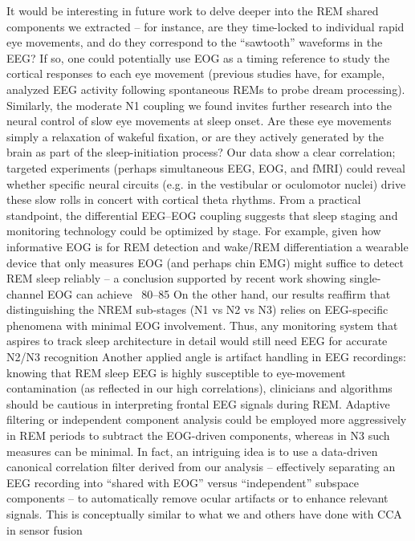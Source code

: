 It would be interesting in future work to delve deeper into the REM shared components we extracted – for instance, are they time-locked to individual rapid eye movements, and do they correspond to the “sawtooth” waveforms in the EEG? If so, one could potentially use EOG as a timing reference to study the cortical responses to each eye movement (previous studies have, for example, analyzed EEG activity following spontaneous REMs to probe dream processing). Similarly, the moderate N1 coupling we found invites further research into the neural control of slow eye movements at sleep onset. Are these eye movements simply a relaxation of wakeful fixation, or are they actively generated by the brain as part of the sleep-initiation process? Our data show a clear correlation; targeted experiments (perhaps simultaneous EEG, EOG, and fMRI) could reveal whether specific neural circuits (e.g. in the vestibular or oculomotor nuclei) drive these slow rolls in concert with cortical theta rhythms. From a practical standpoint, the differential EEG–EOG coupling suggests that sleep staging and monitoring technology could be optimized by stage. For example, given how informative EOG is for REM detection and wake/REM differentiation %
a wearable device that only measures EOG (and perhaps chin EMG) might suffice to detect REM sleep reliably – a conclusion supported by recent work showing single-channel EOG can achieve ~80–85%
On the other hand, our results reaffirm that distinguishing the NREM sub-stages (N1 vs N2 vs N3) relies on EEG-specific phenomena with minimal EOG involvement. Thus, any monitoring system that aspires to track sleep architecture in detail would still need EEG for accurate N2/N3 recognition %
Another applied angle is artifact handling in EEG recordings: knowing that REM sleep EEG is highly susceptible to eye-movement contamination (as reflected in our high correlations), clinicians and algorithms should be cautious in interpreting frontal EEG signals during REM. Adaptive filtering or independent component analysis could be employed more aggressively in REM periods to subtract the EOG-driven components, whereas in N3 such measures can be minimal. In fact, an intriguing idea is to use a data-driven canonical correlation filter derived from our analysis – effectively separating an EEG recording into “shared with EOG” versus “independent” subspace components – to automatically remove ocular artifacts or to enhance relevant signals. This is conceptually similar to what we and others have done with CCA in sensor fusion %
